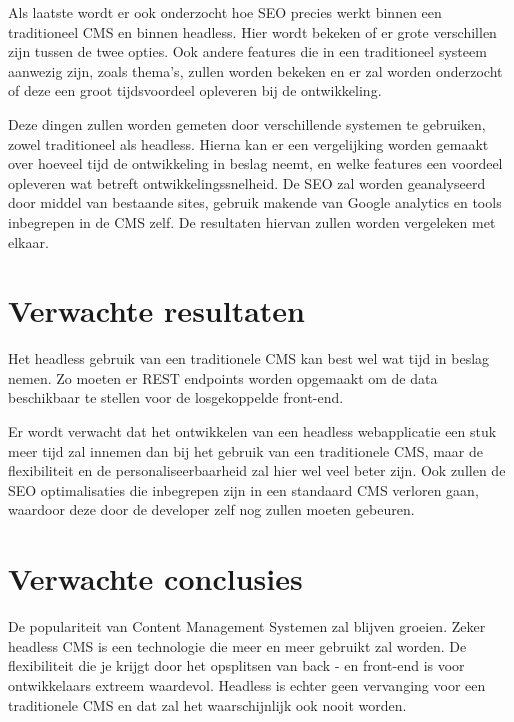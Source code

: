 Als laatste wordt er ook onderzocht hoe SEO precies werkt binnen een traditioneel CMS en binnen headless. Hier wordt bekeken of er grote verschillen zijn tussen de twee opties. Ook andere features die in een traditioneel systeem aanwezig zijn, zoals thema's, zullen worden bekeken en er zal worden onderzocht of deze een groot tijdsvoordeel opleveren bij de ontwikkeling.

Deze dingen zullen worden gemeten door verschillende systemen te gebruiken, zowel traditioneel als headless. Hierna kan er een vergelijking worden gemaakt over hoeveel tijd de ontwikkeling in beslag neemt, en welke features een voordeel opleveren wat betreft ontwikkelingssnelheid. De SEO zal worden geanalyseerd door middel van bestaande sites, gebruik makende van Google analytics en tools inbegrepen in de CMS zelf. De resultaten hiervan zullen worden vergeleken met elkaar.

\section{Verwachte resultaten}
\label{sec:verwachte_resultaten}

Het headless gebruik van een traditionele CMS kan best wel wat tijd in beslag nemen. Zo moeten er REST endpoints worden opgemaakt om de data beschikbaar te stellen voor de losgekoppelde front-end. 

Er wordt verwacht dat het ontwikkelen van een headless webapplicatie een stuk meer tijd zal innemen dan bij het gebruik van een traditionele CMS, maar de flexibiliteit en de personaliseerbaarheid zal hier wel veel beter zijn. Ook zullen de SEO optimalisaties die inbegrepen zijn in een standaard CMS verloren gaan, waardoor deze door de developer zelf nog zullen moeten gebeuren.


\section{Verwachte conclusies}
\label{sec:verwachte_conclusies}

De populariteit van Content Management Systemen zal blijven groeien. Zeker headless CMS is een technologie die meer en meer gebruikt zal worden. De flexibiliteit die je krijgt door het opsplitsen van back - en front-end is voor ontwikkelaars extreem waardevol. Headless is echter geen vervanging voor een traditionele CMS en dat zal het waarschijnlijk ook nooit worden. 

